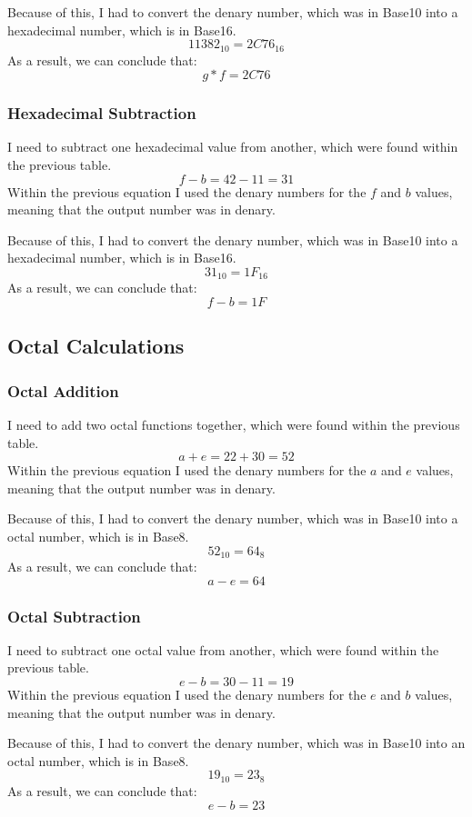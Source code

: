 \documentclass[a4paper,12pt]{article}
\begin{document}
Because of this, I had to convert the denary number, which was in Base10 into a hexadecimal number, which is in Base16.
\[
  11382_{10} = 2C76_{16}
\]
As a result, we can conclude that:
\[
  g * f = 2C76
\]

\newpage

\subsubsection{Hexadecimal Subtraction}
I need to subtract one hexadecimal value from another, which were found within the previous table.
\[
  f - b = 42 - 11 = 31
\]
Within the previous equation I used the denary numbers for the $f$ and $b$ values, meaning that the output number was in denary.

Because of this, I had to convert the denary number, which was in Base10 into a hexadecimal number, which is in Base16.
\[
  31_{10} = 1F_{16}
\]
As a result, we can conclude that:
\[
  f - b = 1F
\]

\newpage

\subsection{Octal Calculations}
\subsubsection{Octal Addition}
I need to add two octal functions together, which were found within the previous table.
\[
  a + e = 22 + 30 = 52
\]
Within the previous equation I used the denary numbers for the $a$ and $e$ values, meaning that the output number was in denary.

Because of this, I had to convert the denary number, which was in Base10 into a octal number, which is in Base8.
\[
  52_{10} = 64_{8}
\]
As a result, we can conclude that:
\[
  a - e = 64
\]

\subsubsection{Octal Subtraction}
I need to subtract one octal value from another, which were found within the previous table.
\[
  e - b = 30 - 11 = 19
\]
Within the previous equation I used the denary numbers for the $e$ and $b$ values, meaning that the output number was in denary.

Because of this, I had to convert the denary number, which was in Base10 into an octal number, which is in Base8.
\[
  19_{10} = 23_{8}
\]
As a result, we can conclude that:
\[
  e - b = 23
\]
\end{document}
